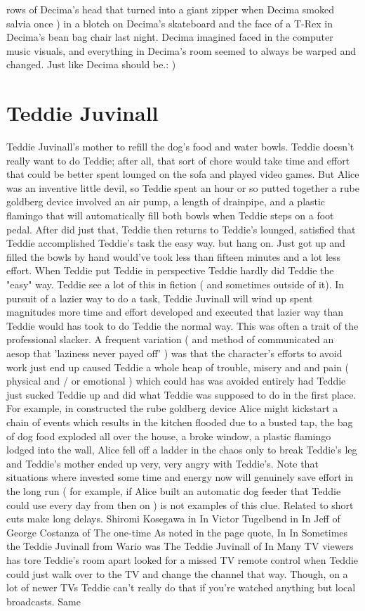 \documentclass[12pt]{book}
\begin{document}
rows of Decima's head that turned into a giant zipper when Decima smoked salvia once ) in a blotch on Decima's skateboard and the face of a T-Rex in Decima's bean bag chair last night. Decima imagined faced in the computer music visuals, and everything in Decima's room seemed to always be warped and changed. Just like Decima should be.: )



\chapter{Teddie Juvinall}

Teddie Juvinall's mother to refill the dog's food and water bowls. Teddie doesn't really want to do Teddie; after all, that sort of chore would take time and effort that could be better spent lounged on the sofa and played video games. But Alice was an inventive little devil, so Teddie spent an hour or so putted together a rube goldberg device involved an air pump, a length of drainpipe, and a plastic flamingo that will automatically fill both bowls when Teddie steps on a foot pedal. After did just that, Teddie then returns to Teddie's lounged, satisfied that Teddie accomplished Teddie's task the easy way. but hang on. Just got up and filled the bowls by hand would've took less than fifteen minutes and a lot less effort. When Teddie put Teddie in perspective Teddie hardly did Teddie the "easy" way. Teddie see a lot of this in fiction ( and sometimes outside of it). In pursuit of a lazier way to do a task, Teddie Juvinall will wind up spent magnitudes more time and effort developed and executed that lazier way than Teddie would has took to do Teddie the normal way. This was often a trait of the professional slacker. A frequent variation ( and method of communicated an aesop that 'laziness never payed off' ) was that the character's efforts to avoid work just end up caused Teddie a whole heap of trouble, misery and and pain ( physical and / or emotional ) which could has was avoided entirely had Teddie just sucked Teddie up and did what Teddie was supposed to do in the first place. For example, in constructed the rube goldberg device Alice might kickstart a chain of events which results in the kitchen flooded due to a busted tap, the bag of dog food exploded all over the house, a broke window, a plastic flamingo lodged into the wall, Alice fell off a ladder in the chaos only to break Teddie's leg and Teddie's mother ended up very, very angry with Teddie's. Note that situations where invested some time and energy now will genuinely save effort in the long run ( for example, if Alice built an automatic dog feeder that Teddie could use every day from then on ) is not examples of this clue. Related to short cuts make long delays. Shiromi Kosegawa in In Victor Tugelbend in In Jeff of George Costanza of The one-time As noted in the page quote, In In Sometimes the Teddie Juvinall from Wario was The Teddie Juvinall of In Many TV viewers has tore Teddie's room apart looked for a missed TV remote control when Teddie could just walk over to the TV and change the channel that way. Though, on a lot of newer TVs Teddie can't really do that if you're watched anything but local broadcasts. Same 
\end{document}
